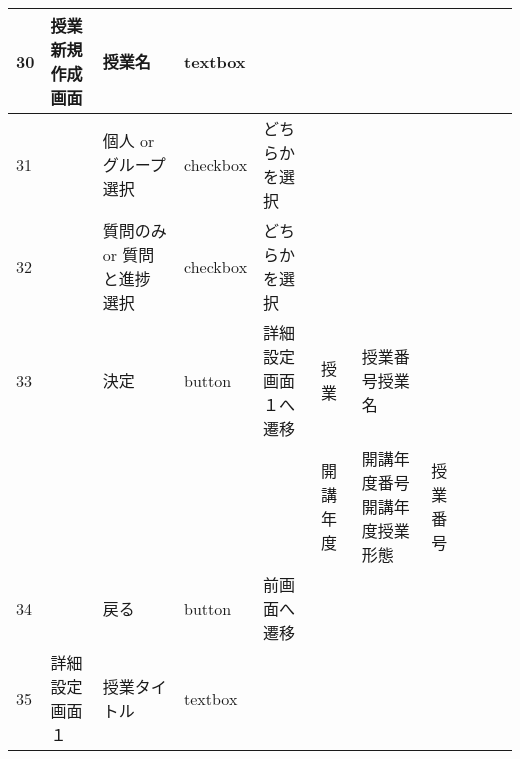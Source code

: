 \begin{landscape}
\newpage
\begin{table}[]
\centering
\begin{tabular}{|l|l|l|l|l|l|l|l|l|l|l|}
\hline
30  & 授業新規作成画面      & 授業名              & textbox  &                                                                   &         &                       &                    &                 &                               &                                                                \\ \hline
31  &               & 個人 or グループ　選択    & checkbox & どちらかを選択                                                           &         &                       &                    &                 &                               &                                                                \\ \hline
32  &               & 質問のみ or 質問と進捗　選択 & checkbox & どちらかを選択                                                           &         &                       &                    &                 &                               &                                                                \\ \hline
33  &               & 決定               & button   & 詳細設定画面１へ遷移                                                        & 授業      & 授業番号授業名               &                    &                 &                               &                                                                \\ \hline
    &               &                  &          &                                                                   & 開講年度    & 開講年度番号開講年度授業形態        & 授業番号               &                 &                               &                                                                \\ \hline
34  &               & 戻る               & button   & 前画面へ遷移                                                            &         &                       &                    &                 &                               &                                                                \\ \hline
35  & 詳細設定画面１       & 授業タイトル           & textbox  &                                                                   &         &                       &                    &                 &                               &                                                                \\ \hline

\end{tabular}
\end{table}
\end{landscape}
